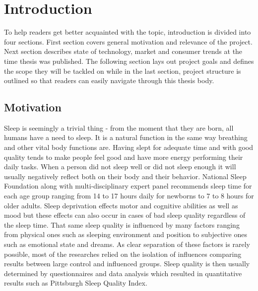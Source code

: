 \chapter{Introduction}
To help readers get better acquainted with the topic, introduction is divided into four sections. First section covers general motivation and relevance of the project. Next section describes state of technology, market and consumer trends at the time thesis was published. The following section lays out project goals and defines the scope they will be tackled on while in the last section, project structure is outlined so that readers can easily navigate through this thesis body.

\section{Motivation}
Sleep is seemingly a trivial thing - from the moment that they are born, all humans have a need to sleep. It is a natural function in the same way breathing and other vital body functions are. Having slept for adequate time and with good quality tends to make people feel good and have more energy performing their daily tasks. When a person did not sleep well or did not sleep enough it will usually negatively reflect both on their body and their behavior. National Sleep Foundation along with multi-disciplinary expert panel recommends sleep time for each age group ranging from 14 to 17 hours daily for newborns to 7 to 8 hours for older adults\cite{NSF}. Sleep deprivation effects motor and cognitive abilities as well as mood but these effects can also occur in cases of bad sleep quality regardless of the sleep time\cite{doi:10.1093/sleep/19.4.318}. That same sleep quality is influenced by many factors ranging from physical ones such as sleeping environment and position to subjective ones such as emotional state and dreams. As clear separation of these factors is rarely possible, most of the researches relied on the isolation of influences comparing results between large control and influenced groups. Sleep quality is then usually determined by questionnaires and data analysis which resulted in quantitative results such as Pittsburgh Sleep Quality Index\cite{psqi}.\\

